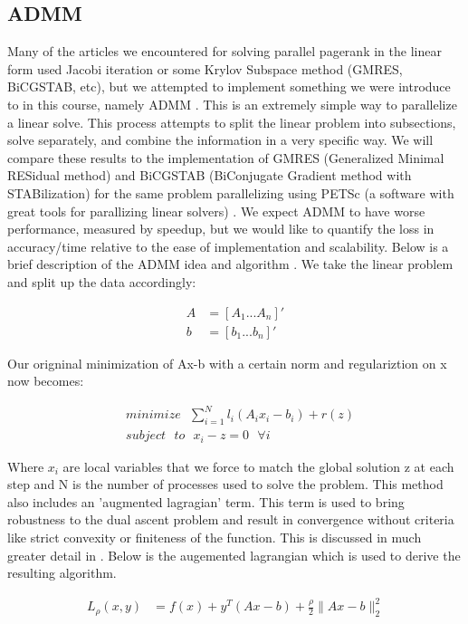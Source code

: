 \documentclass[letterpaper,11pt,onecolumn]{article}
\begin{document}
\subsection{ADMM}

Many of the articles we encountered for solving parallel pagerank in the linear form used Jacobi iteration or some Krylov Subspace method (GMRES, BiCGSTAB, etc), but we attempted to implement something we were introduce to in this course, namely ADMM \cite{ADMM}. This is an extremely simple way to parallelize a linear solve. This process attempts to split the linear problem into subsections, solve separately, and combine the information in a very specific way. 
We will compare these results to the implementation of GMRES (Generalized Minimal RESidual method) and BiCGSTAB (BiConjugate Gradient method with STABilization) for the same problem parallelizing using PETSc (a software with great tools for parallizing linear solvers) \cite{Power Law Graphs}. We expect ADMM to have worse performance, measured by speedup, but we would like to quantify the loss in accuracy/time relative to the ease of implementation and scalability.
\newline
\linebreak
Below is a brief description of the ADMM idea and algorithm \cite{ADMM}.
\newline
We take the linear problem and split up the data accordingly:
\begin{center}
\begin{align}
	A &= \left[ A_{1} ... A_{n} \right]' \\
	b &= \left[ b_{1} ... b_{n} \right]' 
\end{align}
\end{center}
Our origninal minimization of Ax-b with a certain norm and regulariztion on x now becomes:

\begin{center}
\begin{align}
	&minimize \: \: \: \sum_{i=1}^{N} l_{i}(A_{i}x_{i} - b_{i}) + r(z) \\
	&subject \: \: \: to \: \: \: x_{i} - z = 0 \: \: \: \forall i
\end{align}
\end{center}
Where $x_{i}$ are local variables that we force to match the global solution z at each step and N is the number of processes used to solve the problem. This method also includes an 'augmented lagragian' term. This term is used to bring robustness to the dual ascent problem and result in convergence without criteria like strict convexity or finiteness of the function. This is discussed in much greater detail in \cite{ADMM}. Below is the augemented lagrangian which is used to derive the resulting algorithm.
\newline
\begin{center}
  \begin{align}
		L_{\rho}(x,y) &= f(x) + y^{T}(Ax-b) + \frac{\rho}{2}\|Ax - b\|_{2}^{2} \\
  \end{align}
\end{center}
\end{document}
